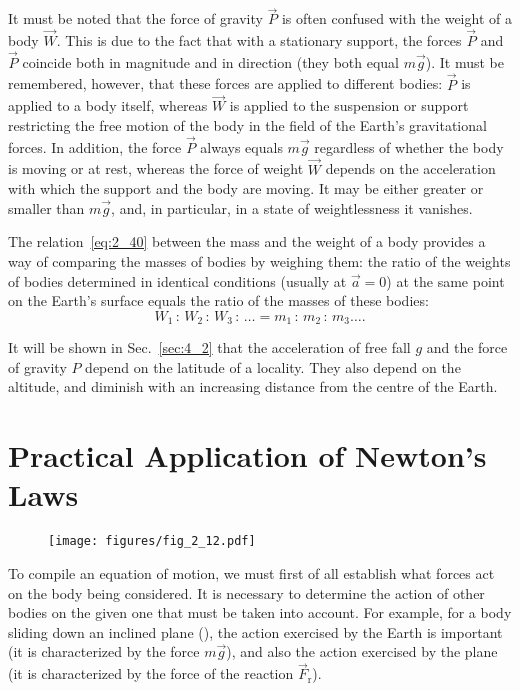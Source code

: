 It must be noted that the force of gravity $\vec{P}$ is often confused with the weight of a body $\vec{W}$. This is due to the fact that with a stationary support, the forces $\vec{P}$ and $\vec{P}$ coincide both in magnitude and in direction (they both equal $m\vec{g}$). It must be remembered, however, that these forces are applied to different bodies: $\vec{P}$ is applied to a body itself, whereas $\vec{W}$ is applied to the suspension or support restricting the free motion of the body in the field of the Earth's gravitational forces. In addition, the force $\vec{P}$ always equals $m\vec{g}$ regardless of whether the body is moving or at rest, whereas the force of weight $\vec{W}$ depends on the acceleration with which the support and the body are moving. It may be either greater or smaller than $m\vec{g}$, and, in particular, in a state of weightlessness it vanishes.

The relation~\eqref{eq:2_40} between the mass and the weight of a body provides a way of comparing the masses of bodies by weighing them: the ratio of the weights of bodies determined in identical conditions (usually at $\vec{a}=0$) at the same point on the Earth's surface equals the ratio of the masses of these bodies:
\begin{equation*}
W_1\,:\,W_2\,:\,W_3\,:\,\ldots = m_1\,:\,m_2\,:\,m_3\ldots.
\end{equation*}

It will be shown in Sec.~\ref{sec:4_2} that the acceleration of free fall $g$ and the force of gravity $P$ depend on the latitude of a locality. They also depend on the altitude, and diminish with an increasing distance from the centre of the Earth.

\section{Practical Application of Newton's Laws}\label{sec:2_12}

\begin{figure}[t]
	\begin{center}
		\texttt{[image: figures/fig\_2\_12.pdf]}
		\caption[]{}
		\label{fig:2_12}
	\end{center}
	\vspace{-0.7cm}
\end{figure}

To compile an equation of motion, we must first of all establish what forces act on the body being considered. It is necessary to determine the action of other bodies on the given one that must be taken into account. For example, for a body sliding down an inclined plane (), the action exercised by the Earth is important (it is characterized by the force $m\vec{g}$), and also the action exercised by the plane (it is characterized by the force of the reaction $\vec{F}_{\text{r}}$).

